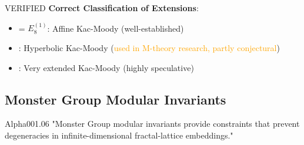 \begin{factcheck}{VERIFIED}
\textbf{Correct Classification of Extensions}:
\begin{itemize}
    \item {} = $E_8^{(1)}$: Affine Kac-Moody (\textcolor{validcolor}{well-established})
    \item {}: Hyperbolic Kac-Moody (\textcolor{orange}{used in M-theory research, partly conjectural})
    \item {}: Very extended Kac-Moody (\textcolor{claimcolor}{highly speculative})
\end{itemize}
\end{factcheck}

\subsection{Monster Group Modular Invariants}

\begin{frameworkclaim}{Alpha001.06}
"Monster Group modular invariants provide constraints that prevent degeneracies in infinite-dimensional fractal-lattice embeddings."
\end{frameworkclaim}

